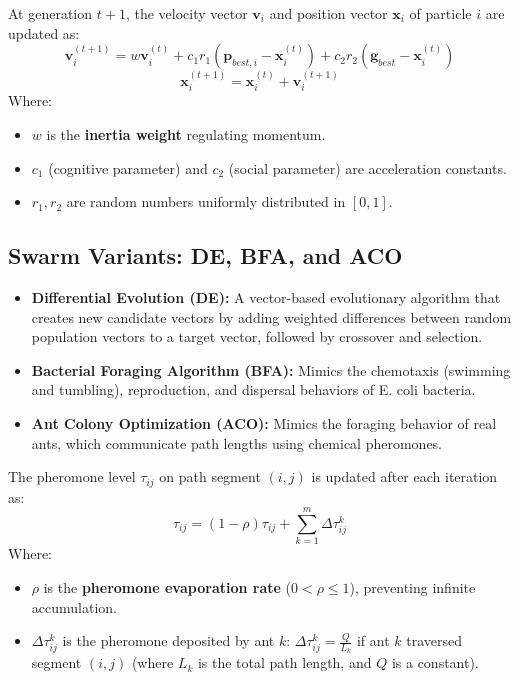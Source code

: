 \documentclass[12pt,a4paper]{article}
\begin{document}
\begin{tcolorbox}[formulabox, title={PSO Particle Update Equations}]
At generation $t+1$, the velocity vector $\mathbf{v}_i$ and position vector $\mathbf{x}_i$ of particle $i$ are updated as:
\begin{equation}
  \mathbf{v}_i^{(t+1)} = w \mathbf{v}_i^{(t)} + c_1 r_1 \left( \mathbf{p}_{best, i} - \mathbf{x}_i^{(t)} \right) + c_2 r_2 \left( \mathbf{g}_{best} - \mathbf{x}_i^{(t)} \right)
\end{equation}
\begin{equation}
  \mathbf{x}_i^{(t+1)} = \mathbf{x}_i^{(t)} + \mathbf{v}_i^{(t+1)}
\end{equation}
Where:
\begin{itemize}[leftmargin=*, itemsep=2.0pt, topsep=0pt]
  \item $w$ is the \textbf{inertia weight} regulating momentum.
  \item $c_1$ (cognitive parameter) and $c_2$ (social parameter) are acceleration constants.
  \item $r_1, r_2$ are random numbers uniformly distributed in $[0, 1]$.
\end{itemize}
\end{tcolorbox}

\subsection{Swarm Variants: DE, BFA, and ACO}
\begin{itemize}[leftmargin=*, itemsep=4pt]
  \item \textbf{Differential Evolution (DE):} A vector-based evolutionary algorithm that creates new candidate vectors by adding weighted differences between random population vectors to a target vector, followed by crossover and selection.
  \item \textbf{Bacterial Foraging Algorithm (BFA):} Mimics the chemotaxis (swimming and tumbling), reproduction, and dispersal behaviors of E. coli bacteria.
  \item \textbf{Ant Colony Optimization (ACO):} Mimics the foraging behavior of real ants, which communicate path lengths using chemical pheromones.
\end{itemize}

\begin{tcolorbox}[formulabox, title={Ant Colony Pheromone Update Rule}]
The pheromone level $\tau_{ij}$ on path segment $(i, j)$ is updated after each iteration as:
\begin{equation}
  \tau_{ij} = (1 - \rho)\tau_{ij} + \sum_{k=1}^m \Delta \tau_{ij}^k
\end{equation}
Where:
\begin{itemize}[leftmargin=*, itemsep=2.0pt, topsep=0pt]
  \item $\rho$ is the \textbf{pheromone evaporation rate} ($0 < \rho \le 1$), preventing infinite accumulation.
  \item $\Delta \tau_{ij}^k$ is the pheromone deposited by ant $k$: $\Delta \tau_{ij}^k = \frac{Q}{L_k}$ if ant $k$ traversed segment $(i, j)$ (where $L_k$ is the total path length, and $Q$ is a constant).
\end{itemize}
\end{tcolorbox}
\end{document}
